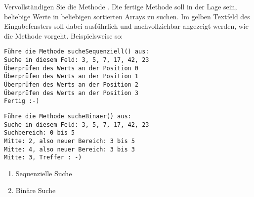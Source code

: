 \documentclass{lehramt-informatik}
\begin{document}
Vervollständigen Sie die Methode . Die fertige
Methode soll in der Lage sein, beliebige Werte in beliebigen sortierten
Arrays zu suchen. Im gelben Textfeld des Eingabefensters soll dabei
ausführlich und nachvollziehbar angezeigt werden, wie die Methode
vorgeht. Beispielsweise so:

{
\tiny
\begin{multicols}{2}
\begin{verbatim}
Führe die Methode sucheSequenziell() aus:
Suche in diesem Feld: 3, 5, 7, 17, 42, 23
Überprüfen des Werts an der Position 0
Überprüfen des Werts an der Position 1
Überprüfen des Werts an der Position 2
Überprüfen des Werts an der Position 3
Fertig :-)
\end{verbatim}

\begin{verbatim}
Führe die Methode sucheBinaer() aus:
Suche in diesem Feld: 3, 5, 7, 17, 42, 23
Suchbereich: 0 bis 5
Mitte: 2, also neuer Bereich: 3 bis 5
Mitte: 4, also neuer Bereich: 3 bis 3
Mitte: 3, Treffer : -)
\end{verbatim}
\end{multicols}
}

\begin{enumerate}
\item Sequenzielle Suche
\begin{antwort}
\end{antwort}

\item Binäre Suche

\begin{antwort}
\end{antwort}

\end{enumerate}

\literatur
\end{document}
